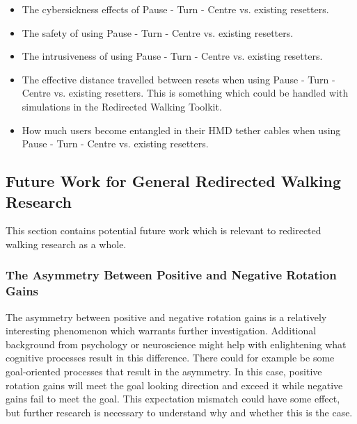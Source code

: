 \begin{itemize}
    \item The cybersickness effects of Pause - Turn - Centre vs. existing resetters.
    \item The safety of using Pause - Turn - Centre vs. existing resetters.
    \item The intrusiveness of using Pause - Turn - Centre vs. existing resetters.
    \item The effective distance travelled between resets when using Pause - Turn - Centre vs. existing resetters. This is something which could be handled with simulations in the Redirected Walking Toolkit. 
    \item How much users become entangled in their HMD tether cables when using Pause - Turn - Centre vs. existing resetters.
\end{itemize}

\subsection{Future Work for General Redirected Walking Research}
This section contains potential future work which is relevant to redirected walking research as a whole.

\subsubsection{The Asymmetry Between Positive and Negative Rotation Gains}
The asymmetry between positive and negative rotation gains is a relatively interesting phenomenon which warrants further investigation. Additional background from psychology or neuroscience might help with enlightening what cognitive processes result in this difference. There could for example be some goal-oriented processes that result in the asymmetry. In this case, positive rotation gains will meet the goal looking direction and exceed it while negative gains fail to meet the goal. This expectation mismatch could have some effect, but further research is necessary to understand why and whether this is the case. 
      
